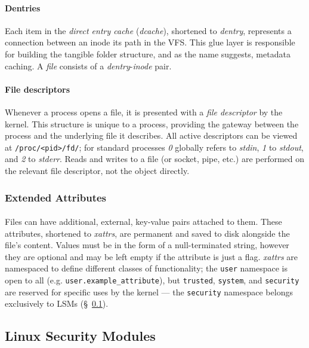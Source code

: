 \paragraph{Dentries} Each item in the \textit{direct entry cache} (\textit{dcache}), shortened to \textit{dentry}, represents a connection between an inode its path in the VFS. This glue layer is responsible for building the tangible folder structure, and as the name suggests, metadata caching. A \textit{file} consists of a \textit{dentry}-\textit{inode} pair.

\paragraph{File descriptors} Whenever a process opens a file, it is presented with a \textit{file descriptor} by the kernel. This structure is unique to a process, providing the gateway between the process and the underlying file it describes. All active descriptors can be viewed at \texttt{/proc/<pid>/fd/}; for standard processes \textit{0} globally refers to \textit{stdin}, \textit{1} to \textit{stdout}, and \textit{2} to \textit{stderr}. Reads and writes to a file (or socket, pipe, etc.) are performed on the relevant file descriptor, not the object directly.

\subsubsection{Extended Attributes} 

\paragraph{} Files can have additional, external, key-value pairs attached to them. These attributes, shortened to \textit{xattrs}, are permanent and saved to disk alongside the file's content. Values must be in the form of a null-terminated string, however they are optional and may be left empty if the attribute is just a flag. \textit{xattrs} are namespaced to define different classes of functionality; the \texttt{user} namespace is open to all (e.g. \texttt{user.example\_attribute}), but \texttt{trusted}, \texttt{system}, and \texttt{security} are reserved for specific uses by the kernel --- the \texttt{security} namespace belongs exclusively to LSMs (§~\ref{sec:lsm}).




\subsection{Linux Security Modules}
\label{sec:lsm}

